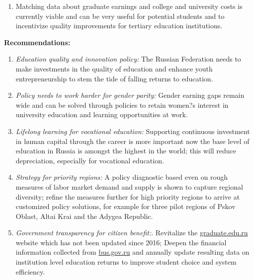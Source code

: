 \documentclass[alpha-refs]{wiley-article-04t}
\begin{document}
\begin{mdframed}[hidealllines=true,backgroundcolor=blue!20]
\begin{enumerate}
\item Matching data about graduate earnings and college and university 
costs is currently viable and can be very useful for potential students and 
to incentivize quality improvements for tertiary education institutions.
\end{enumerate} 

\vspace{-1em}

\hspace{-2.8em}  \textbf{Recommendations:} 
\vspace{-1em}
\begin{enumerate}

\item \textit{Education quality and innovation policy:} The Russian 
Federation needs to make investments in the quality of education and 
enhance youth entrepreneurship to stem the tide of falling returns to 
education.

\item \textit{Policy needs to work harder for gender parity:} Gender 
earning gaps remain wide and can be solved through policies to retain 
women?s interest in university education and learning opportunities at work.

\item \textit{Lifelong learning for vocational education:} Supporting 
continuous investment in human capital through the career is more important 
now the base level of education in Russia is amongst the highest in the 
world; this will reduce depreciation, especially for vocational education.

\item \textit{Strategy for priority regions:} A policy diagnostic based 
even on rough measures of labor market demand and supply is shown to 
capture regional diversity; refine the measures further for high priority 
regions to arrive at customized policy solutions, for example for three 
pilot regions of Pskov Oblast, Altai Krai and the Adygea Republic.


\item \textit{Government transparency for citizen benefit:}. Revitalize the 
\href{https:\\graduate.edu.ru}{graduate.edu.ru} website which has not 
been updated since 2016; Deepen the financial information collected from 
\href{https:\\bus.gov.ru}{bus.gov.ru} and annually update resulting data on 
institution level education returns to  improve student choice and system 
efficiency.

\end{enumerate} 

	
\end{mdframed}
\end{document}
